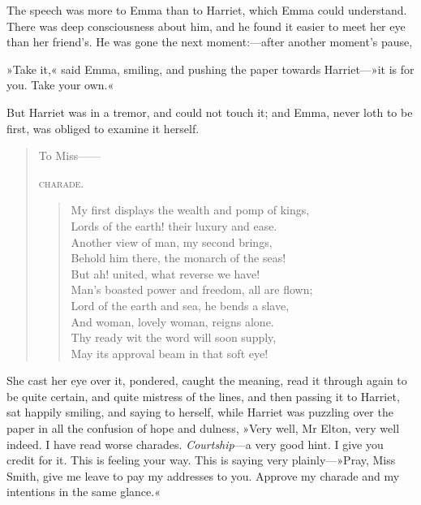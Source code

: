 The speech was more to Emma than to Harriet, which Emma could understand. There was deep consciousness about him, and he found it easier to meet her eye than her friend's. He was gone the next moment:—after another moment's pause,

»Take it,« said Emma, smiling, and pushing the paper towards Harriet—»it is for you. Take your own.«

But Harriet was in a tremor, and could not touch it; and Emma, never loth to be first, was obliged to examine it herself.

\begin{quotation}
To Miss——

\textsc{charade.}

\begin{verse}
\begin{altverse}
My first displays the wealth and pomp of kings,\\
    Lords of the earth! their luxury and ease.\\
Another view of man, my second brings,\\
    Behold him there, the monarch of the seas!\\

But ah! united, what reverse we have!\\
    Man's boasted power and freedom, all are flown;\\
Lord of the earth and sea, he bends a slave,\\
    And woman, lovely woman, reigns alone.\\

    Thy ready wit the word will soon supply,\\
    May its approval beam in that soft eye!\\
\end{altverse}
\end{verse}
\end{quotation}

She cast her eye over it, pondered, caught the meaning, read it through again to be quite certain, and quite mistress of the lines, and then passing it to Harriet, sat happily smiling, and saying to herself, while Harriet was puzzling over the paper in all the confusion of hope and dulness, »Very well, Mr Elton, very well indeed. I have read worse charades. \textit{Courtship}—a very good hint. I give you credit for it. This is feeling your way. This is saying very plainly—»Pray, Miss Smith, give me leave to pay my addresses to you. Approve my charade and my intentions in the same glance.«

